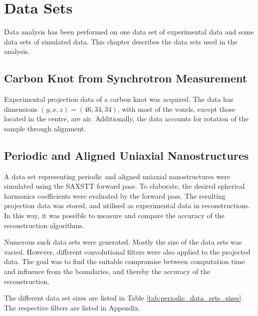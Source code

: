 \chapter{Data Sets} %
\label{sec:reconstruction_data_sets}

Data analysis has been performed on one data set of experimental data and some data sets of simulated data.
This chapter describes the data sets used in the analysis.

\section{Carbon Knot from Synchrotron Measurement}
Experimental projection data of a carbon knot was acquired.
The data has dimensions $(y,x,z) = (46,34,34)$, with most of the voxels, except those located in the centre, are air.  %
Additionally, the data accounts for rotation of the sample through alignment. %


\section{Periodic and Aligned Uniaxial Nanostructures}
A data set representing periodic and aligned uniaxial nanostructures were simulated using the SAXSTT forward pass.
To elaborate, the desired spherical harmonics coefficients were evaluated by the forward pass.
The resulting projection data was stored, and utilised as experimental data in reconstructions.
In this way, it was possible to measure and compare the accuracy of the reconstruction algorithms.

Numerous such data sets were generated. Mostly the size of the data sets was varied. However, different convolutional filters were also applied to the projected data.
The goal was to find the suitable compromise between computation time and influence from the boundaries, and thereby the accuracy of the reconstruction.

The different data set sizes are listed in Table \ref{tab:periodic_data_sets_sizes}. The respective filters are listed in Appendix. %

